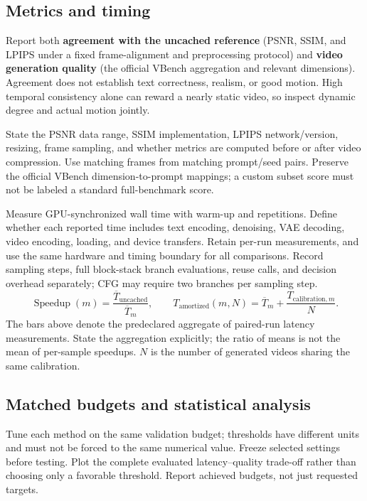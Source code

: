 \documentclass[11pt,a4paper]{article}
\begin{document}
\subsection{Metrics and timing}
Report both \textbf{agreement with the uncached reference} (PSNR, SSIM, and LPIPS under
a fixed frame-alignment and preprocessing protocol) and \textbf{video generation
quality} (the official VBench aggregation and relevant dimensions). Agreement does not
establish text correctness, realism, or good motion. High temporal consistency alone
can reward a nearly static video, so inspect dynamic degree and actual motion jointly.

State the PSNR data range, SSIM implementation, LPIPS network/version, resizing, frame
sampling, and whether metrics are computed before or after video compression. Use
matching frames from matching prompt/seed pairs. Preserve the official VBench
dimension-to-prompt mappings; a custom subset score must not be labeled a standard
full-benchmark score.

Measure GPU-synchronized wall time with warm-up and repetitions. Define whether each
reported time includes text encoding, denoising, VAE decoding, video encoding, loading,
and device transfers. Retain per-run measurements, and use the same hardware and
timing boundary for all comparisons. Record sampling steps, full block-stack branch
evaluations, reuse calls, and decision overhead separately; CFG may require two
branches per sampling step.
\begin{equation}
\operatorname{Speedup}(m)=\frac{\overline T_{\mathrm{uncached}}}{\overline T_m},
\qquad
T_{\mathrm{amortized}}(m,N)=\overline T_m+\frac{T_{\mathrm{calibration},m}}{N}.
\end{equation}
The bars above denote the predeclared aggregate of paired-run latency measurements.
State the aggregation explicitly; the ratio of means is not the mean of per-sample
speedups. $N$ is the number of generated videos sharing the same calibration.

\subsection{Matched budgets and statistical analysis}
Tune each method on the same validation budget; thresholds have different units and
must not be forced to the same numerical value. Freeze selected settings before
testing. Plot the complete evaluated latency--quality trade-off rather than choosing
only a favorable threshold. Report achieved budgets, not just requested targets.
\end{document}
